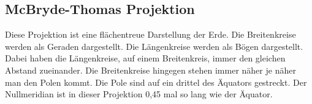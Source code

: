 \subsection{McBryde-Thomas Projektion}
\label{sec:mcbryde-thomas}
Diese Projektion ist eine flächentreue Darstellung der Erde. Die Breitenkreise werden als Geraden dargestellt. Die Längenkreise werden als Bögen dargestellt. Dabei haben die Längenkreise, auf einem Breitenkreis, immer den gleichen Abstand zueinander. Die Breitenkreise hingegen stehen immer näher je näher man den Polen kommt. Die Pole sind auf ein drittel des Äquators gestreckt. Der Nullmeridian ist in dieser Projektion 0,45 mal so lang wie der Äquator.

